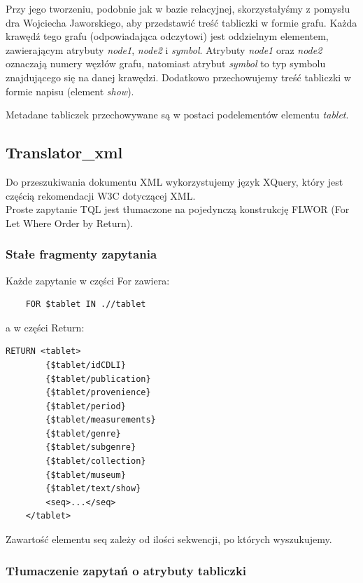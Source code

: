 Przy jego tworzeniu, podobnie jak w bazie relacyjnej, skorzystałyśmy z pomysłu dra Wojciecha Jaworskiego, 
aby przedstawić treść tabliczki w formie grafu. 
Każda krawędź tego grafu (odpowiadająca odczytowi) jest oddzielnym elementem, zawierającym atrybuty \textit{node1}, \textit{node2} 
i \textit{symbol}.
Atrybuty \textit{node1} oraz \textit{node2} oznaczają numery węzłów grafu,
natomiast atrybut \textit{symbol} to typ symbolu znajdującego się na danej krawędzi. 
Dodatkowo przechowujemy treść tabliczki w formie napisu (element \textit{show}). 

Metadane tabliczek przechowywane są w postaci podelementów elementu \textit{tablet}.


\subsection{Translator\_xml}
Do przeszukiwania dokumentu XML wykorzystujemy język XQuery, który jest częścią rekomendacji W3C dotyczącej XML.\\
Proste zapytanie TQL jest tłumaczone na pojedynczą konstrukcję FLWOR (For Let Where Order by Return).\\

\subsubsection{Stałe fragmenty zapytania}
Każde zapytanie w części For zawiera:
	\begin{verbatim}
	FOR $tablet IN .//tablet
\end{verbatim}
a w części Return:
  \begin{verbatim}RETURN <tablet>
		{$tablet/idCDLI}
		{$tablet/publication}
		{$tablet/provenience}
		{$tablet/period}
		{$tablet/measurements}
		{$tablet/genre}
		{$tablet/subgenre}
		{$tablet/collection}
		{$tablet/museum}
		{$tablet/text/show}
		<seq>...</seq>
	</tablet>
\end{verbatim}
Zawartość elementu seq zależy od ilości sekwencji, po których wyszukujemy. 

\subsubsection{Tłumaczenie zapytań o atrybuty tabliczki}

